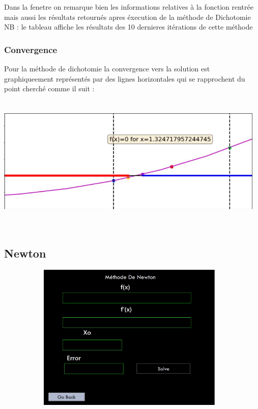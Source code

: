 \documentclass{article}
\begin{document}
Dans la fenetre on remarque bien les informations relatives à la fonction rentrée mais aussi les résultats retournés apres éxecution de la méthode de Dichotomie \\
NB : le tableau affiche les résultats des 10 dernieres itérations de cette méthode  
\subsubsection{Convergence}
Pour la méthode de dichotomie la convergence vers la solution est graphiqueement représentés par des lignes horizontales qui se rapprochent du point cherché comme il suit : \\
\includegraphics[width=13cm,height=7cm]{img/dicho_cv.JPG}\\


\subsection{Newton}
\includegraphics[width=13cm,height=7cm]{img/newton.JPG}\\
\end{document}

